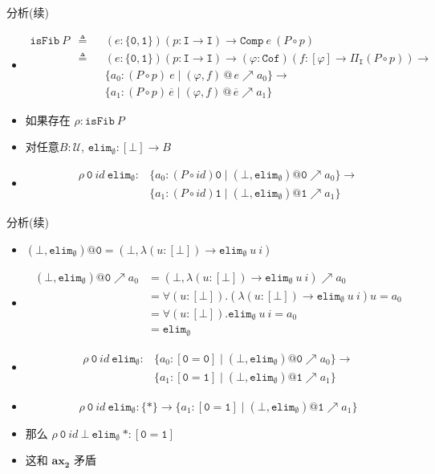 \documentclass[aspectratio=169,xcolor=dvipsnames]{beamer}
\newcommand\calU{\mathcal{U}}
\newcommand\isFib{\mathtt{isFib}}
\newcommand\Comp{\mathtt{Comp}}
\newcommand\ttI{\mathtt{I}}
\newcommand\elim{\mathtt{elim}}
\newcommand\ttzero{\mathtt{0}}
\newcommand\ttone{\mathtt{1}}
\newcommand{\ax}[1]{\mathbf{ax_{#1}}}
\newcommand\Cof{\mathtt{Cof}}
\begin{document}
\begin{frame}{分析(续)}
\begin{itemize}
  \item \begin{align*}\isFib\ P &\triangleq &&(e:\{\ttzero,\ttone\})(p:\ttI\to\ttI)\to\Comp\ e\ (P \circ p) \\
       &\triangleq&&(e:\{\ttzero,\ttone\})(p:\ttI\to\ttI)\to (\varphi:\Cof)(f:[\varphi]\to\Pi_{\ttI}(P \circ p)) \to\\
       &&&\{ a_0 : (P \circ p)\ e \mid (\varphi,f)\,@\,e \nearrow a_0 \} \to \\
       &&&\{a_1:(P \circ p)\,\overline{e}\mid(\varphi,f)\,@\,\overline{e}\nearrow a_1 \}
  \end{align*}
  \item 如果存在 $\rho : \isFib\ P$
  \item 对任意$B:\calU$, $\elim_{\emptyset} : [\bot]\to B$
  \item \begin{align*}\rho\ \ttzero\ id\ \elim_{\emptyset} : &\{a_0:(P\circ id) \ttzero \mid (\bot,\elim_{\emptyset})@\ttzero\nearrow a_0\} \to \\
  &\{ a_1:(P\circ id) \ttone \mid (\bot,\elim_{\emptyset})@\ttone\nearrow a_1 \} \end{align*}
\end{itemize}
\end{frame}

\begin{frame}{分析(续)}
\begin{itemize}
  \item $(\bot,\elim_{\emptyset})@\ttzero = (\bot,\lambda(u:[\bot])\to \elim_{\emptyset}\ u\ i)$
  \item \begin{align*}(\bot,\elim_{\emptyset})@\ttzero\nearrow a_0 &= (\bot,\lambda(u:[\bot])\to \elim_{\emptyset}\ u\ i)\nearrow a_0 \\
  &= \forall(u:[\bot]).(\lambda(u:[\bot])\to \elim_{\emptyset}\ u\ i)u = a_0 \\
  &=\forall(u:[\bot]).\elim_{\emptyset}\ u\ i = a_0\\
  &=\elim_{\emptyset}
\end{align*}
  \item \begin{align*}\rho\ \ttzero\ id\ \elim_{\emptyset} : &\{a_0:[\ttzero=\ttzero] \mid (\bot,\elim_{\emptyset})@\ttzero\nearrow a_0\} \to \\
  &\{ a_1:[\ttzero=\ttone] \mid (\bot,\elim_{\emptyset})@\ttone\nearrow a_1 \} \end{align*}
  \item \[\rho\ \ttzero\ id\ \elim_{\emptyset} : \{\ast\} \to \{ a_1:[\ttzero=\ttone] \mid (\bot,\elim_{\emptyset})@\ttone\nearrow a_1 \} \]
  \item 那么 $\rho\ \ttzero\ id\ \bot\ \elim_{\emptyset}\ \ast : [\ttzero = \ttone]$
  \item 这和 $\ax{2}$ 矛盾
\end{itemize}
\end{frame}
\end{document}

